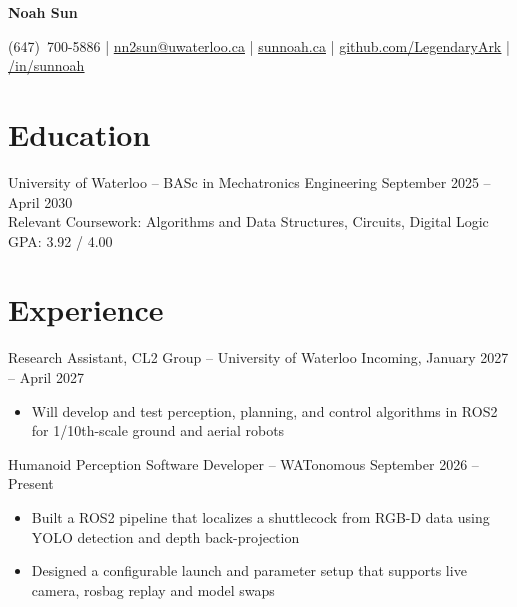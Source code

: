\documentclass[11pt]{article}       %
\newcommand{\textsb}[1]{{\fontseries{sb}\selectfont #1}}
\newcommand{\icon}[1]{\raisebox{0em}{#1}}
\begin{document}
\centerline{\huge \textbf{Noah Sun}}

\vspace{-6pt}

\begin{center}
(647)~700-5886 \;|\;
\href{mailto:nn2sun@uwaterloo.ca}{nn2sun@uwaterloo.ca} \;|\;
\href{https://www.sunnoah.ca}{\underline{sunnoah.ca}} \;|\;
\href{https://github.com/LegendaryArk}{\underline{github.com/LegendaryArk}} \;|\;
\href{https://www.linkedin.com/in/sunnoah/}{\underline{/in/sunnoah}}
\end{center}

\vspace{-9pt}

\section*{Education}
\textsb{University of Waterloo} -- BASc in Mechatronics Engineering \hfill September 2025 -- April 2030 \\[2pt]
\hspace{12pt} Relevant Coursework: Algorithms and Data Structures, Circuits, Digital Logic \hfill GPA: 3.92 / 4.00 \\

\section*{Experience}

\textsb{Research Assistant, CL2 Group} -- University of Waterloo \hfill Incoming, January 2027 -- April 2027 \\
\begin{itemize}
    \item Will develop and test perception, planning, and control algorithms in ROS2 for 1/10th-scale ground and aerial robots
\end{itemize}

\vspace{6pt}

\textsb{Humanoid Perception Software Developer} -- WATonomous \hfill September 2026 -- Present \\
\begin{itemize}
    \item Built a ROS2 pipeline that localizes a shuttlecock from RGB-D data using YOLO detection and depth back-projection
    \item Designed a configurable launch and parameter setup that supports live camera, rosbag replay and model swaps
\end{itemize}
\end{document}
